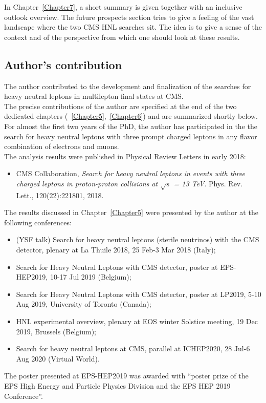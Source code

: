 In Chapter~\ref{Chapter7}, a short summary is given together with an
inclusive outlook overview. The future prospects section tries to give a feeling of the vast landscape
where the two CMS HNL searches sit. The idea is to give a sense of the
context and of the perspective from which one should look at these results.

\subsection*{Author's contribution}

The author contributed to the development and finalization of the
searches for heavy neutral leptons in multilepton final
states at CMS.\\
The precise contributions of the author are specified at
the end of the two dedicated chapters
(~\ref{Chapter5},~\ref{Chapter6}) 
and are summarized shortly below.\\

For almost the first two years of the PhD, the author
has participated in the the search for heavy neutral leptons with three
prompt charged leptons in any flavor combination of electrons and
muons. \\
The analysis
results were published in Physical Review Letters in early 2018:
\begin{itemize}
\setlength\itemsep{-0.1em}
\item CMS Collaboration, \emph{Search for heavy neutral leptons in events with three charged leptons
in proton-proton collisions at $\sqrt{s}$ = 13 TeV}. Phys. Rev. Lett., 120(22):221801, 2018.
\end{itemize}

The results discussed in Chapter~\ref{Chapter5} were presented by the author at the following
conferences:
\begin{itemize}
\setlength\itemsep{-0.1em}
\item (YSF talk) Search for heavy neutral leptons (sterile
  neutrinos) with the CMS detector, plenary at La Thuile 2018, 25
  Feb-3 Mar 2018 (Italy);
\item Search for Heavy Neutral Leptons with CMS detector, poster at
  EPS-HEP2019, 10-17 Jul 2019 (Belgium);
\item Search for Heavy Neutral Leptons with CMS detector, poster at
  LP2019, 5-10 Aug 2019, University of Toronto (Canada);
\item HNL experimental overview, plenary at EOS winter Solstice
  meeting, 19 Dec 2019, Brussels (Belgium);
\item  Search for heavy neutral leptons at CMS, parallel at
  ICHEP2020, 28 Jul-6 Aug 2020 (Virtual World).
\end{itemize}
The poster presented at EPS-HEP2019 was awarded with ``poster prize of
the EPS High Energy and Particle Physics Division and the EPS HEP 2019
Conference''.\\
 
